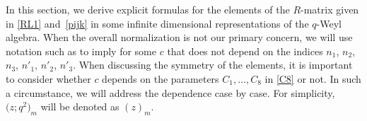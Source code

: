 \documentclass[pdftex]{sigma}
\numberwithin{equation}{section}
\begin{document}
In this section, we derive explicit formulas for the elements of the
$R$-matrix given in \eqref{RL1} and~\eqref{pijk} in some infinite
dimensional representations of the $q$-Weyl algebra. When the overall
normalization is not our primary concern, we will use notation such as
 to imply
 for some $c$ that does not depend on the indices $n_1$,
$n_2$, $n_3$, $n'_1$, $n'_2$, $n'_3$. When discussing the symmetry of
the elements, it is important to consider whether $c$ depends on the
parameters $C_1, \dots, C_8$ in \eqref{C8} or not. In such a
circumstance, we will address the dependence case by case. For
simplicity, $\bigl(z;q^2\bigr)_m$ will be denoted as $(z)_m$.
\end{document}
